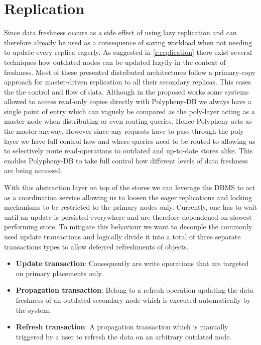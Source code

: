 \section{Replication}
\label{replication}
Since data freshness occurs as a side effect of using lazy replication and can therefore already
be used as a consequence of saving workload when not needing to update every replica eagerly.
As suggested in \ref{r:replication} there exist several techniques how outdated nodes can be updated lazyily in the context of freshness.
Most of these presented distributed architectures follow a primary-copy approach for master-driven replication to all their secondary replicas.
This eases the the control and flow of data. Although in the proposed works some systems allowed to access read-only copies directly
with Polypheny-DB we always have a single point of entry which can vaguely be compared as the poly-layer acting as a master node
when distributing or even routing queries. Hence Polypheny acts as the master anyway. However since any requests have to pass through the poly-layer
we have full control how and where queries need to be routed to allowing us to selectively route read-operations to outdated and up-to-date stores alike.
This enables Polypheny-DB to take full control how different levels of data freshness are being accessed.

With this abstraction layer on top of the stores we can leverage the DBMS to act as a coordination service allowing us to loosen the eager replications and 
locking mechanisms to be restricted to the primary nodes only. Currently, one has to wait until an update is persisted everywhere and are therefore
dependened on slowest performing store.
To mitigate this behaviour we want to decouple the commonly used update transactions and logically divide it into a total of three separate transactions types
to allow deferred refreshments of objects.
\begin{itemize}
    \item \textbf{Update transaction}: Consequently are write operations that are targeted on primary placements only.
    \item \textbf{Propagation transaction}: Belong to a refresh operation updating the data freshness of an outdated secondary node which is 
    executed automatically by the system.
    \item \textbf{Refresh transaction}: A propagation transaction which is manually triggered by a user to refresh the data on an arbitrary outdated node.
\end{itemize}

